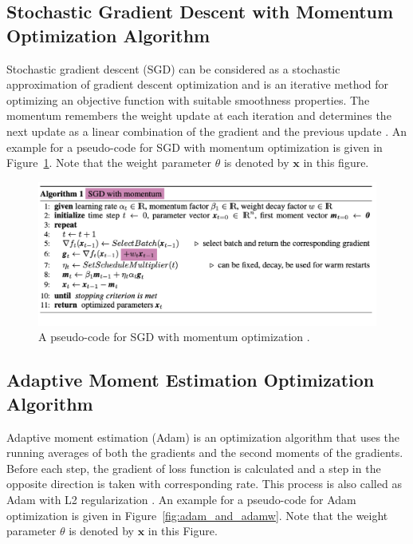 \subsection{Stochastic Gradient Descent with Momentum  Optimization Algorithm}

Stochastic gradient descent (SGD) can be considered as a stochastic approximation of gradient descent optimization \cite{gradient_descent_algorithms} and is an iterative method for optimizing an objective function with suitable smoothness properties. The momentum remembers the weight update at each iteration and determines the next update as a linear combination of the gradient and the previous update \cite{SGD_Momentum}. An example for a pseudo-code for SGD with momentum optimization is given in Figure~\ref{fig:sgd_momentum}. Note that the weight parameter $\theta$ is denoted by $\textbf{x}$ in this figure.

\begin{figure}[h]
	\centering
	\includegraphics[width=\linewidth]{fig/sgd_momentum.png}
	\caption{A pseudo-code for SGD with momentum optimization \cite{weight_decay_regularization}.}
	\label{fig:sgd_momentum}
\end{figure}

\subsection{Adaptive Moment Estimation Optimization Algorithm}

Adaptive moment estimation (Adam) is an optimization algorithm that uses the running averages of both the gradients and the second moments of the gradients. Before each step, the gradient of loss function is calculated and a step in the opposite direction is taken with corresponding rate. This process is also called as Adam with L2 regularization \cite{Adam}. An example for a pseudo-code for Adam optimization is given in Figure~\ref{fig:adam_and_adamw}. Note that the weight parameter $\theta$ is denoted by $\textbf{x}$ in this Figure.

